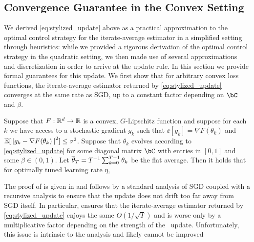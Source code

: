 \subsection{Convergence Guarantee in the Convex Setting}\label{ssec:convex_guarantees}

We derived \eqref{eq:stylized_update} above as a practical approximation to the optimal control strategy for the iterate-average estimator in a simplified setting through heuristics: while we provided a rigorous derivation of the optimal control strategy in the quadratic setting, we then made use of several approximations and discretization in order to arrive at the update rule.  In this section we provide formal guarantees for this update.  We first show that for arbitrary convex loss functions, the iterate-average estimator returned by \eqref{eq:stylized_update} converges at the same rate as SGD, up to a constant factor depending on $\bC$ and $\beta$.
\begin{theorem}\label{thm:convex_convergence}
    Suppose that $F: \mathbb{R}^d \to \mathbb{R}$ is a convex, $G$-Lipschitz function and suppose for each $k$ we have access to a stochastic gradient $g_k$ such that $\ee[g_k] = \nabla F(\theta_k)$ and $\mathbb{E}[\left\|g_k - \nabla F(\theta_k)\right\|^2] \leq \sigma^2$.  Suppose that $\theta_k$ evolves according to \eqref{eq:stylized_update} for some diagonal matrix $\bC$ with entries in $[0, 1]$ and some $\beta \in (0, 1)$. Let $\overline{\theta}_T = T^{-1} \sum_{k=0}^{T-1} \theta_k$ be the flat average. Then it holds that for optimally tuned learning rate $\eta$,
    \iftoggle{colt}{$\ee\left[ F(\thetabar_T) - F(\mustar) \right] \leq \nicefrac{\sqrt{2 - \beta}}{\beta} \cdot \norm{\theta_1 - \mustar} \cdot \sqrt{\nicefrac{(G^2 + \sigma^2)}{T}}$.}{
    \begin{align}
        \ee\left[ F(\thetabar_T) - F(\mustar) \right] \leq \frac{\sqrt{2 - \beta}}{\beta} \cdot \norm{\theta_1 - \mustar} \cdot \sqrt{\frac{G^2 + \sigma^2}{T}}.
    \end{align}
    }
\end{theorem}
The proof of  is given in  and follows by a standard analysis of SGD coupled with a recursive analysis to ensure that the update does not drift too far away from SGD itself.  In particular,  ensures that the iterate-average estimator returned by \eqref{eq:stylized_update} enjoys the same $O(1/\sqrt{T})$ and is worse only by a multiplicative factor depending on the strength of the \ema\ update.  Unfortunately, this issue is intrinsic to the analysis and likely cannot be improved\iftoggle{colt}{.}{ without additional assumptions.} 



